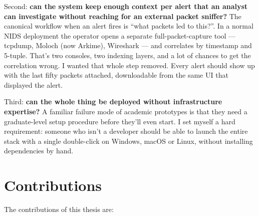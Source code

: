 Second: \textbf{can the system keep enough context per alert that
an analyst can investigate without reaching for an external packet
sniffer?} The canonical workflow when an alert fires is ``what
packets led to this?''. In a normal NIDS deployment the operator
opens a separate full-packet-capture tool --- tcpdump, Moloch
(now Arkime), Wireshark --- and correlates by timestamp and
5-tuple. That's two consoles, two indexing layers, and a lot of
chances to get the correlation wrong. I wanted that whole step
removed. Every alert should show up with the last fifty packets
attached, downloadable from the same UI that displayed the alert.

Third: \textbf{can the whole thing be deployed without
infrastructure expertise?} A familiar failure mode of academic
prototypes is that they need a graduate-level setup procedure
before they'll even start. I set myself a hard requirement:
someone who isn't a developer should be able to launch the entire
stack with a single double-click on Windows, macOS or Linux,
without installing dependencies by hand.

\section{Contributions}
\label{sec:contributions}

The contributions of this thesis are:

